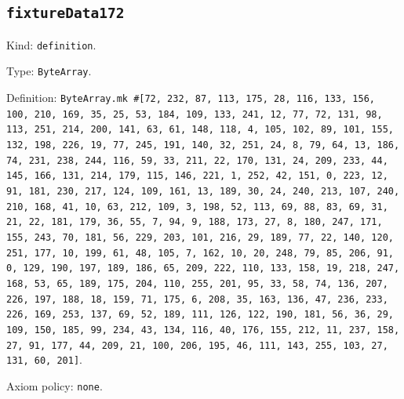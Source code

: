 \documentclass[11pt]{article}
\begin{document}
\subsection*{\texttt{fixtureData172}}
\noindent Kind: \texttt{definition}.\par
\noindent Type: \texttt{ByteArray}.\par
\noindent Definition: \texttt{ByteArray.mk \#[72, 232, 87, 113, 175, 28, 116, 133, 156, 100, 210, 169, 35, 25, 53, 184, 109, 133, 241, 12, 77, 72, 131, 98, 113, 251, 214, 200, 141, 63, 61, 148, 118, 4, 105, 102, 89, 101, 155, 132, 198, 226, 19, 77, 245, 191, 140, 32, 251, 24, 8, 79, 64, 13, 186, 74, 231, 238, 244, 116, 59, 33, 211, 22, 170, 131, 24, 209, 233, 44, 145, 166, 131, 214, 179, 115, 146, 221, 1, 252, 42, 151, 0, 223, 12, 91, 181, 230, 217, 124, 109, 161, 13, 189, 30, 24, 240, 213, 107, 240, 210, 168, 41, 10, 63, 212, 109, 3, 198, 52, 113, 69, 88, 83, 69, 31, 21, 22, 181, 179, 36, 55, 7, 94, 9, 188, 173, 27, 8, 180, 247, 171, 155, 243, 70, 181, 56, 229, 203, 101, 216, 29, 189, 77, 22, 140, 120, 251, 177, 10, 199, 61, 48, 105, 7, 162, 10, 20, 248, 79, 85, 206, 91, 0, 129, 190, 197, 189, 186, 65, 209, 222, 110, 133, 158, 19, 218, 247, 168, 53, 65, 189, 175, 204, 110, 255, 201, 95, 33, 58, 74, 136, 207, 226, 197, 188, 18, 159, 71, 175, 6, 208, 35, 163, 136, 47, 236, 233, 226, 169, 253, 137, 69, 52, 189, 111, 126, 122, 190, 181, 56, 36, 29, 109, 150, 185, 99, 234, 43, 134, 116, 40, 176, 155, 212, 11, 237, 158, 27, 91, 177, 44, 209, 21, 100, 206, 195, 46, 111, 143, 255, 103, 27, 131, 60, 201]}.\par
\noindent Axiom policy: \texttt{none}.\par
\end{document}
